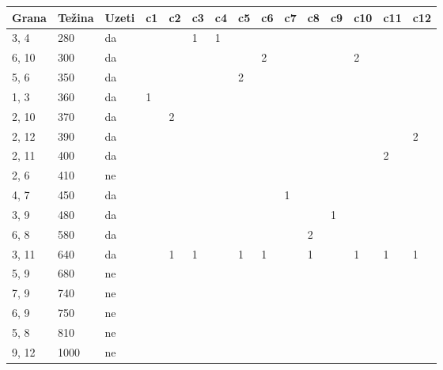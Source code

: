\documentclass[12pt]{article}
\begin{document}
\begin{table}[hp]
\centering
\begin{tabular}{|l|l|l|l|l|l|l|l|l|l|l|l|l|l|l|}
\hline
Grana  & Težina & Uzeti & c1 & c2 & c3 & c4 & c5 & c6 & c7 & c8 & c9 & c10 & c11 & c12 \\ \hline
3, 4   & 280    & da    &    &    & 1  & 1  &    &    &    &    &    &     &     &     \\ \hline
6, 10  & 300    & da    &    &    &    &    &    & 2  &    &    &    & 2   &     &     \\ \hline
5, 6   & 350    & da    &    &    &    &    & 2  &    &    &    &    &     &     &     \\ \hline
1, 3   & 360    & da    & 1  &    &    &    &    &    &    &    &    &     &     &     \\ \hline
2, 10  & 370    & da    &    & 2  &    &    &    &    &    &    &    &     &     &     \\ \hline
2, 12  & 390    & da    &    &    &    &    &    &    &    &    &    &     &     & 2   \\ \hline
2, 11  & 400    & da    &    &    &    &    &    &    &    &    &    &     & 2   &     \\ \hline
2, 6   & 410    & ne    &    &    &    &    &    &    &    &    &    &     &     &     \\ \hline
4, 7   & 450    & da    &    &    &    &    &    &    & 1  &    &    &     &     &     \\ \hline
3, 9   & 480    & da    &    &    &    &    &    &    &    &    & 1  &     &     &     \\ \hline
6, 8   & 580    & da    &    &    &    &    &    &    &    & 2  &    &     &     &     \\ \hline
3, 11  & 640    & da    &    & 1  & 1  &    & 1  & 1  &    & 1  &    & 1   & 1   & 1   \\ \hline
5, 9   & 680    & ne    &    &    &    &    &    &    &    &    &    &     &     &     \\ \hline
7, 9   & 740    & ne    &    &    &    &    &    &    &    &    &    &     &     &     \\ \hline
6, 9   & 750    & ne    &    &    &    &    &    &    &    &    &    &     &     &     \\ \hline
5, 8   & 810    & ne    &    &    &    &    &    &    &    &    &    &     &     &     \\ \hline
9, 12  & 1000   & ne    &    &    &    &    &    &    &    &    &    &     &     &     \\ \hline

\end{tabular}
\end{table}
\end{document}
